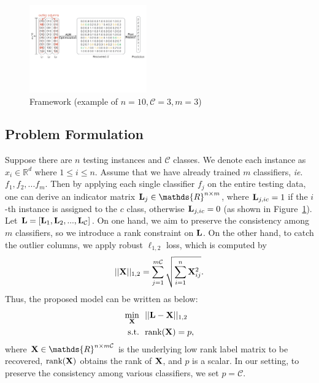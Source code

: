 \documentclass[letterpaper]{article}
\def\calC{{\mathcal{C}}}
\def\bL{{\bf L}}
\def\dsR{\mathds{R}}
\def\bX{{\bf X}}
\def\bX{{\bf X}}
\def\st{{\text{s.t.}}}
\def\ie{\emph{ie}}
\def\rank{{\text{rank}}}
\begin{document}
\begin{figure}[h]
\centering\includegraphics[width=0.45\textwidth]{resource/frame_work.pdf}
\caption{Framework (example of $n=10, \calC=3, m=3$)}
\label{fig:framework}
\end{figure}




\subsection{Problem Formulation}

Suppose there are $n$ testing instances and $\calC$ classes.
We denote each instance as $x_i \in \dsR^{d}$ where $1 \leq i \leq n$.
Assume that we have already trained $m$ classifiers, \ie. $f_1, f_2, ... f_m$.
Then by applying each single classifier $f_j$ on the entire testing data, one can derive an indicator matrix $\bL_j \in \dsR^{n \times m}$, where $\bL_{j, ic} = 1$ if the $i$-th instance is assigned to the $c$ class, otherwise $\bL_{j, ic} = 0$ (as shown in Figure~\ref{fig:framework}).
Let $\bL = [ \bL_1, \bL_2, ..., \bL_\calC ]$.
On one hand, we aim to preserve the consistency among $m$ classifiers, so we introduce a rank constraint on $\bL$.
On the other hand, to catch the outlier columns, we apply robust $\ell_{1, 2}$ loss, which is computed by
$$ || \bX ||_{1,2} = \sum_{j = 1}^{m\calC} \sqrt{ \sum_{i = 1}^{n} \bX_{ij}^2 } . $$
Thus, the proposed model can be written as below:
\begin{align}\label{eq:l12_rankconstraint}
  \min_{\bX} ~&~ || \bL - \bX ||_{1,2}    \nonumber \\
  \st ~&~ \rank(\bX) = p   ,
\end{align}
\noindent
where $\bX \in \dsR^{n \times m\calC}$ is the underlying low rank label matrix to be recovered, $\rank(\bX)$ obtains the rank of $\bX$,
and $p$ is a scalar.
In our setting, to preserve the consistency among various classifiers, we set $p = \calC$.
\end{document}
